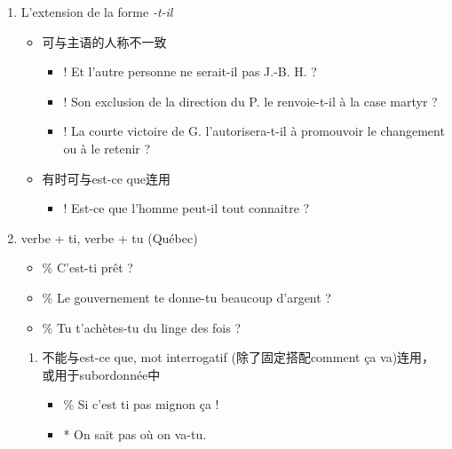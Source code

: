 \documentclass[UTF8]{report}
\begin{document}
\begin{enumerate}
    \item L’extension de la forme \textit{-t-il}
    \begin{itemize}
        \item 可与主语的人称不一致
        \begin{itemize}
            \item ! Et l’autre personne ne serait-il pas J.-B. H. ?
            \item ! Son exclusion de la direction du P. le renvoie-t-il à la case martyr ?
            \item ! La courte victoire de G. l’autorisera-t-il à promouvoir le changement ou à le retenir ?
        \end{itemize}
        \item 有时可与est-ce que连用
        \begin{itemize}
            \item ! Est-ce que l’homme peut-il tout connaitre ?
        \end{itemize}
    \end{itemize}
    \item verbe + ti, verbe + tu (Québec)
    \begin{itemize}
        \item \% C’est-ti prêt ?
        \item \% Le gouvernement te donne-tu beaucoup d’argent ?
        \item \% Tu t’achètes-tu du linge des fois ? 
    \end{itemize}
    \begin{enumerate}
        \item 不能与est-ce que, mot interrogatif (除了固定搭配comment ça va)连用， 或用于subordonnée中
        \begin{itemize}
            \item \% Si c’est ti pas mignon ça !
            \item * On sait pas où on va-tu.
        \end{itemize}
    \end{enumerate}
\end{enumerate}
\end{document}
